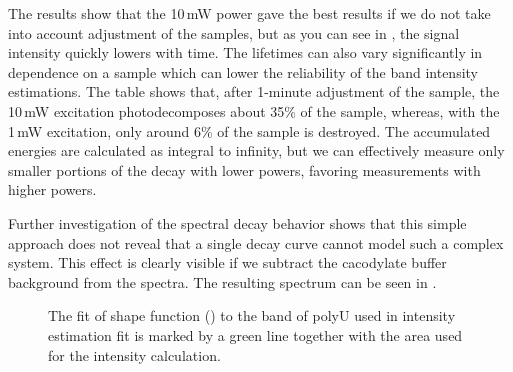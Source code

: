 \begin{table}
	\centering
	
	\caption[%
		Lifetimes of polyU in dependence on excitation power estimated from raw
		spectra.%
	]{%
		$E_0$ are total energies accumulated by detector divided by maximal value
		across all the excitation powers $P$, and $E$ are energies accumulated from
		time $T = 60\pm20$\,s, which was needed for the adjustment of the
		samples before the acquisition can even start, but the sample needs to be
		irradiated by the excitation laser.
		The last column contains fractions of the samples $r$ which were not
		destroyed by photodecomposition after the time $T$.
	}
	\label{\tablabel{power_optim:lifetimes_triplexes}}
\end{table}

The results show that the 10\,mW power gave the best results if we do not take
into account adjustment of the samples, but as you can see in
,
the signal intensity quickly lowers with time.
The lifetimes can also vary significantly in dependence on a sample which can
lower the reliability of the band intensity estimations.
The table shows that, after 1-minute adjustment of the sample, the 10\,mW
excitation photodecomposes about 35\% of the sample, whereas, with the 1\,mW
excitation, only around 6\% of the sample is destroyed.
The accumulated energies are calculated as integral to infinity, but we can
effectively measure only smaller portions of the decay with lower powers,
favoring measurements with higher powers.

Further investigation of the spectral decay behavior shows that this simple
approach does not reveal that a single decay curve cannot model such a complex
system.
This effect is clearly visible if we subtract the cacodylate buffer background
from the spectra.
The resulting spectrum can be seen in
.

\begin{figure}
	\centering
	
	\caption[%
		Example UV RR spectrum of polyU dissolved in cacodylate buffer with
	  the cacodylate buffer background subtracted.%
	]{%
		The fit of shape function
		()
		to the band of polyU used in intensity estimation fit is marked by a green
		line together with the area used for the intensity calculation.
	}
	\label{\figlabel{power_optim:triplexes2_pU}}
\end{figure}

